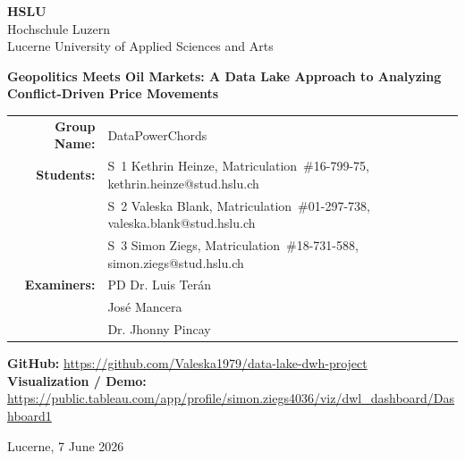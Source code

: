 \documentclass[11pt,a4paper]{article}
\makeatletter
\newcommand{\projecttitle}{Geopolitics Meets Oil Markets: A Data Lake Approach to Analyzing Conflict-Driven Price Movements}
\newcommand{\groupname}{DataPowerChords}
\newcommand{\studentone}{S~1 Kethrin Heinze, Matriculation~\#16-799-75, kethrin.heinze@stud.hslu.ch}
\newcommand{\studenttwo}{S~2 Valeska Blank, Matriculation~\#01-297-738, valeska.blank@stud.hslu.ch}
\newcommand{\studentthree}{S~3 Simon Ziegs, Matriculation~\#18-731-588, simon.ziegs@stud.hslu.ch}
\newcommand{\examinerone}{PD Dr. Luis Terán}
\newcommand{\examinertwo}{José Mancera}
\newcommand{\examinerthree}{Dr. Jhonny Pincay}
\newcommand{\githuburl}{\url{https://github.com/Valeska1979/data-lake-dwh-project}}
\newcommand{\vizurl}{\url{https://public.tableau.com/app/profile/simon.ziegs4036/viz/dwl_dashboard/Dashboard1}}
\newcommand{\submissiondate}{Lucerne, 7 June 2026}
\makeatother
\begin{document}

\begin{titlepage}
  \begin{flushleft}
    \textbf{\huge HSLU}\\[0.1em]
    {\large Hochschule Luzern}\\
    {\large Lucerne University of Applied Sciences and Arts}
  \end{flushleft}

  \vspace{4cm}
  \begin{center}{\LARGE \textbf{\projecttitle}}\end{center}
  \vspace{2cm}

  \begin{center}
  \begin{tabular}{r l}
    \textbf{Group Name:}  & \groupname \\
    \textbf{Students:}    & \studentone \\
                          & \studenttwo \\
                          & \studentthree \\[1em]
    \textbf{Examiners:}   & \examinerone \\
                          & \examinertwo \\
                          & \examinerthree \\
  \end{tabular}
  \end{center}

  \vspace{2cm}
  \begin{center}
    \textbf{GitHub:} \githuburl \\[0.3em]
    \textbf{Visualization / Demo:} \vizurl
  \end{center}

  \vfill
  \begin{center}\submissiondate\end{center}
\end{titlepage}


\tableofcontents
\clearpage

\listoffigures

\listoftables
\clearpage

\setcounter{page}{1}
\end{document}
